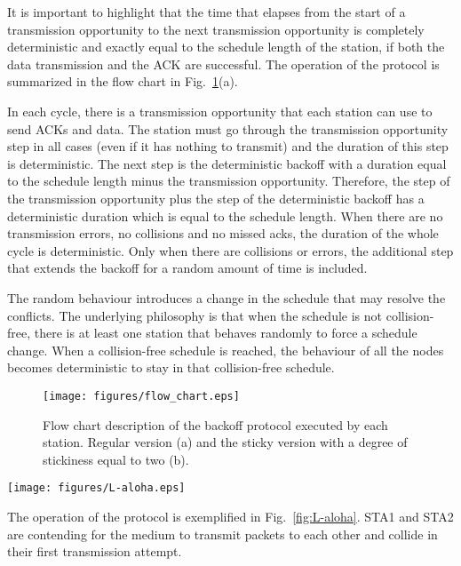 \documentclass[twocolumn]{svjour3}          \smartqed  \usepackage{graphicx}
\begin{document}
It is important to highlight that the time that elapses from the start of a transmission opportunity to the next transmission opportunity is completely deterministic and exactly equal to the schedule length  of the station, if both the data transmission and the ACK are successful.
The operation of the protocol is summarized in the flow chart in Fig.~\ref{fig:flow_chart}(a).

In each cycle, there is a transmission opportunity that each station can use to send ACKs and data.
The station must go through the transmission opportunity step in all cases (even if it has nothing to transmit) and the duration of this step is deterministic.
The next step is the deterministic backoff with a duration equal to the schedule length minus the transmission opportunity.
Therefore, the step of the transmission opportunity plus the step of the deterministic backoff has a deterministic duration which is equal to the schedule length.
When there are no transmission errors, no collisions and no missed acks, the duration of the whole cycle is deterministic.
Only when there are collisions or errors, the additional step that extends the backoff for a random amount of time is included.

The random behaviour introduces a change in the schedule that may resolve the conflicts. The underlying philosophy is that when the schedule is not collision-free, there is at least one station that behaves randomly to force a schedule change.
When a collision-free schedule is reached, the behaviour of all the nodes becomes deterministic to stay in that collision-free schedule.


\begin{figure}
\centering
  \texttt{[image: figures/flow\_chart.eps]}
\caption{Flow chart description of the backoff protocol executed by each station. Regular version (a) and the sticky version with a degree of stickiness equal to two (b).}
\label{fig:flow_chart}
\end{figure}

\begin{figure*}
\centering
  \texttt{[image: figures/L-aloha.eps]}
\caption{An example of the operation of the protocol with two contending stations.}
\label{fig:L-aloha}
\end{figure*}

The operation of the protocol is exemplified in Fig.~\ref{fig:L-aloha}.
STA1 and STA2 are contending for the medium to transmit packets to each other  and collide in their first transmission attempt.
\end{document}
